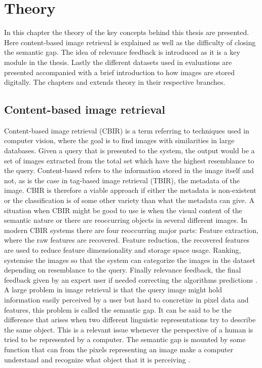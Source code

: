 
\chapter{Theory}
\label{chapter:cbirtheory}
In this chapter the theory of the key concepts behind this thesis are presented. Here content-based image retrieval is explained as well as the difficulty of closing the semantic gap. The idea of relevance feedback is introduced as it is a key module in the thesis. Lastly the different datasets used in evaluations are presented accompanied with a brief introduction to how images are stored digitally. 
The chapters \emph{} and \emph{} extends theory in their respective branches.

\section{Content-based image retrieval}

Content-based image retrieval (CBIR) is a term referring to techniques used in computer vision, where the goal is to find images with similarities in large databases. Given a query that is presented to the system, the output would be a set of images extracted from the total set which have the highest resemblance to the query. Content-based refers to the information stored in the image itself and not, as is the case in tag-based image retrieval (TBIR), the metadata of the image. CBIR is therefore a viable approach if either the metadata is non-existent or the classification is of some other variety than what the metadata can give. A situation when CBIR might be good to use is when the visual content of the semantic nature or there are reoccurring objects in several different images. In modern CBIR systems there are four reoccurring major parts: Feature extraction, where the raw features are recovered. Feature reduction, the recovered features are used to reduce feature dimensionality and storage space usage. Ranking, systemise the images so that the system can categorize the images in the dataset depending on resemblance to the query. Finally relevance feedback, the final feedback given by an expert user if needed correcting the algorithms predictions \cite{kundu2015graph}. A large problem in image retrieval is that the query image might hold information easily perceived by a user but hard to concretize in pixel data and features, this problem is called the semantic gap. It can be said to be the difference that arises when two different linguistic representations try to describe the same object. This is a relevant issue whenever the perspective of a human is tried to be represented by a computer. The semantic gap is mounted by some function that can from the pixels representing an image make a computer understand and recognize what object that it is perceiving \cite{smeulders2000semantic}.


